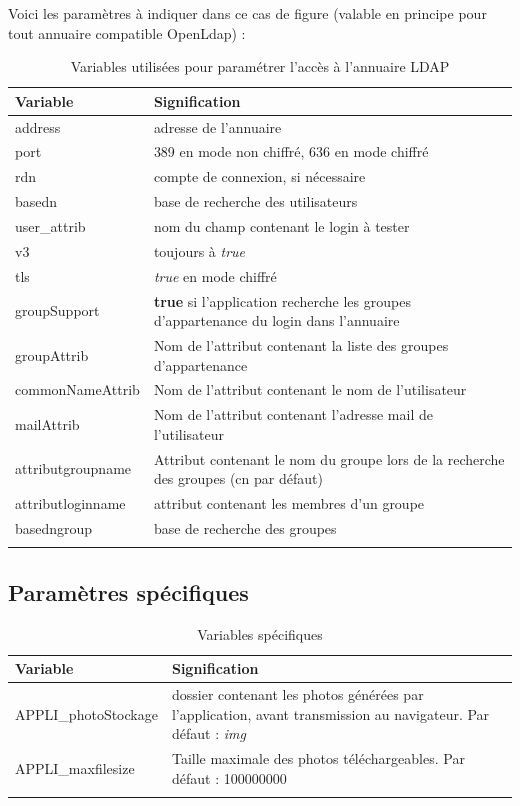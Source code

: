 Voici les paramètres à indiquer dans ce cas de figure (valable en principe pour tout annuaire compatible OpenLdap) : 
\begin{longtable}{|p{4cm}|p{11cm}|}
\hline
\textbf{Variable} & \textbf{Signification} \\
\hline
\endhead
address &  adresse de l'annuaire\\
\hline
port & 389 en mode non chiffré, 636 en mode chiffré\\
\hline
rdn & compte de connexion, si nécessaire \\
\hline
basedn & base de recherche des utilisateurs\\
\hline
user\_attrib & nom du champ contenant le login à tester\\
\hline
v3 & toujours à \textit{true}\\
\hline
tls & \textit{true} en mode chiffré\\
\hline
groupSupport & \textbf{true} si l'application recherche les groupes d'appartenance du login dans l'annuaire\\
\hline
groupAttrib & Nom de l'attribut contenant la liste des groupes d'appartenance\\
\hline
commonNameAttrib & Nom de l'attribut contenant le nom de l'utilisateur\\
\hline
mailAttrib & Nom de l'attribut contenant l'adresse mail de l'utilisateur\\
\hline
attributgroupname & Attribut contenant le nom du groupe lors de la recherche des groupes (cn par défaut)\\
\hline
attributloginname & attribut contenant les membres d'un groupe\\
\hline
basedngroup & base de recherche des groupes \\
\hline
\caption{Variables utilisées pour paramétrer l'accès à l'annuaire LDAP}
\end{longtable}

\subsection{Paramètres spécifiques}
\label{paramspec}

\begin{longtable}{|p{4cm}|p{11cm}|}
\hline
\textbf{Variable} & \textbf{Signification} \\
\hline
\endhead
APPLI\_photoStockage & dossier contenant les photos générées par l'application, avant transmission au navigateur. Par défaut : \textit{img}\\
\hline
APPLI\_maxfilesize & Taille maximale des photos téléchargeables. Par défaut : 100000000 \\
\hline

\caption{Variables spécifiques}
\end{longtable}

